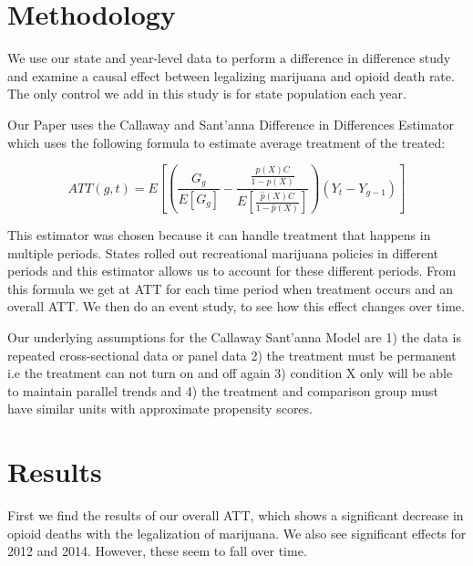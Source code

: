 \documentclass{article}
\begin{document}





\section*{Methodology} %

We use our state and year-level data to perform a difference in difference study and examine a causal effect between legalizing marijuana and opioid death rate. The only control we add in this study is for state population each year. 

Our Paper uses the Callaway and Sant'anna Difference in Differences Estimator which uses the following formula to estimate average treatment of the treated:

$$ATT(g,t)=E[(  \frac{G_g}{ E[G_g]} - \frac{ \frac{ \hat{p} (X)C}{1- \hat{p} (X)}}{E [\frac{\hat{p} (X) C } {1 - \hat{p} (X)}]}) (Y_t - Y_{g-1})]$$

This estimator was chosen because it can handle treatment that happens in multiple periods. States rolled out recreational marijuana policies in different periods and this estimator allows us to account for these different periods. From this formula we get at ATT for each time period when treatment occurs and an overall ATT. We then do an event study, to see how this effect changes over time.

Our underlying assumptions for the Callaway Sant'anna Model are 1) the data is repeated cross-sectional data or panel data 2) the treatment must be permanent i.e the treatment can not turn on and off again 3) condition X only will be able to maintain parallel trends and 4) the treatment and comparison group must have similar units with approximate propensity scores.

\section*{Results}

First we find the results of our overall ATT, which shows a significant decrease in opioid deaths with the legalization of marijuana. We also see significant effects for 2012 and 2014. However, these seem to fall over time.


\end{document}

